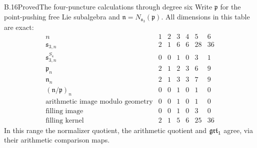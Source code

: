 \begin{statement}{B.16}{Proved}{The four-puncture calculations through degree six}
Write $\mathfrak p$ for the point-pushing free Lie
subalgebra and $\mathfrak n=N_{\mathfrak s_3}(\mathfrak p)$.
All dimensions in this table are exact:
\[
\begin{array}{c|rrrrrr}
n&1&2&3&4&5&6\\ \hline
\mathfrak s_{3,n}&2&1&6&6&28&36\\
\mathfrak s_{3,n}^{S_4}&0&0&1&0&3&1\\
\mathfrak p_n&2&1&2&3&6&9\\
\mathfrak n_n&2&1&3&3&7&9\\
(\mathfrak n/\mathfrak p)_n&0&0&1&0&1&0\\
\text{arithmetic image modulo geometry}&0&0&1&0&1&0\\
\text{filling image}&0&0&1&0&3&0\\
\text{filling kernel}&2&1&5&6&25&36
\end{array}
\]
In this range the normalizer quotient, the arithmetic
quotient and $\mathfrak{grt}_1$ agree, via their arithmetic
comparison maps.
\end{statement}
